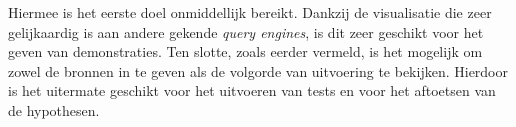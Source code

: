 Hiermee is het eerste doel onmiddellijk bereikt. Dankzij de visualisatie die zeer gelijkaardig is aan andere gekende \textit{query engines}, is dit zeer geschikt voor het geven van demonstraties. Ten slotte, zoals eerder vermeld, is het mogelijk om zowel de bronnen in te geven als de volgorde van uitvoering te bekijken. Hierdoor is het uitermate geschikt voor het uitvoeren van tests en voor het aftoetsen van de hypothesen.